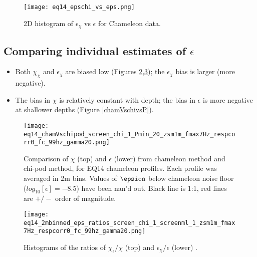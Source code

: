 \documentclass[11pt]{article}
\begin{document}
\begin{figure}[htbp]
\texttt{[image: eq14\_epschi\_vs\_eps.png]}
\caption{2D histogram of $\epsilon_{\chi}$ vs $\epsilon$ for Chameleon data.}
\label{}
\end{figure}









\clearpage
\subsection{Comparing individual estimates of $\epsilon$}

\begin{itemize}

\item Both $\chi_{\chi}$ and $\epsilon_{\chi}$ are biased low (Figures \ref{2DchamVschi},\ref{histchamVschi}); the $\epsilon_{\chi}$ bias is larger (more negative).

\item The bias in $\chi$ is relatively constant with depth; the bias in $\epsilon$ is more negative at shallower depths (Figure \ref{chamVschivsP}).

\end{itemize}


\begin{figure}[htbp]
\texttt{[image: eq14\_chamVschipod\_screen\_chi\_1\_Pmin\_20\_zsm1m\_fmax7Hz\_respcorr0\_fc\_99hz\_gamma20.png]}
\caption{Comparison of $\chi$ (top) and $\epsilon$ (lower) from chameleon method and chi-pod method, for EQ14 chameleon profiles. Each profile was averaged in 2m bins.  Values of $\epsion$ below chameleon noise floor ($log_{10}[\epsilon]=-8.5$) have been nan'd out. Black line is 1:1, red lines are $+/-$ order of magnitude. }
\label{2DchamVschi}
\end{figure}


\begin{figure}[htbp]
\texttt{[image: eq14\_2mbinned\_eps\_ratios\_screen\_chi\_1\_screenml\_1\_zsm1m\_fmax7Hz\_respcorr0\_fc\_99hz\_gamma20.png]}
\caption{Histograms of the ratios of $\chi_{\epsilon}/\chi$ (top) and $\epsilon_{\chi}/\epsilon$ (lower) .}
\label{histchamVschi}
\end{figure}
\end{document}

